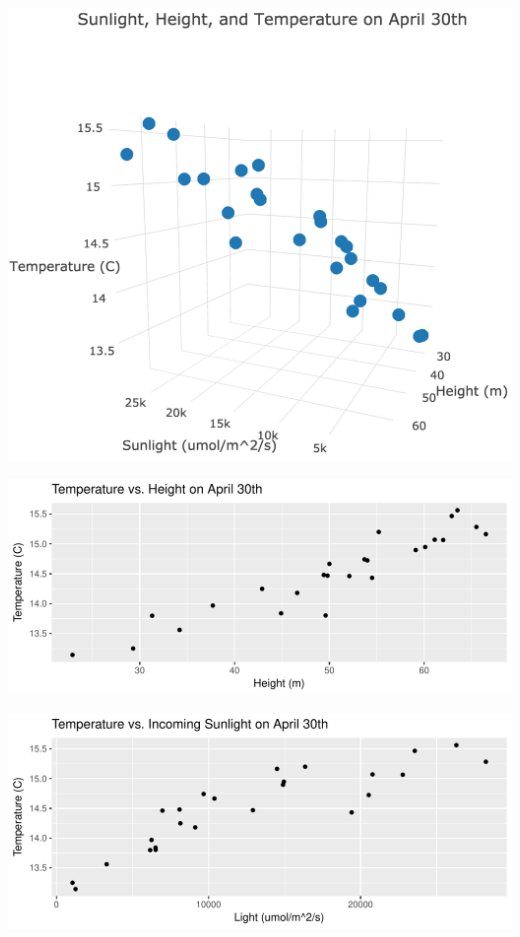 \documentclass[english]{article}\usepackage[]{graphicx}\usepackage[]{color}
\makeatletter
\def\maxwidth{ %
  \ifdim\Gin@nat@width>\linewidth
    \linewidth
  \else
    \Gin@nat@width
  \fi
}
\newenvironment{knitrout}{}{} %
\makeatother
\begin{document}
\begin{center}
\includegraphics[scale=.75]{plot3.png}
\end{center}

\begin{knitrout}
\color{fgcolor}
\includegraphics[width=\maxwidth]{figure/q3-1} 

\includegraphics[width=\maxwidth]{figure/q3-2} 

\end{knitrout}
\end{document}
